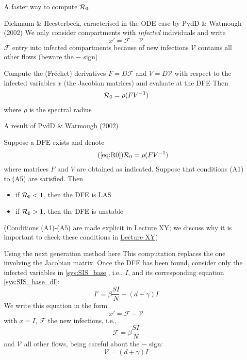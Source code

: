 \documentclass[aspectratio=43]{beamer}
\begin{document}
\begin{frame}{A faster way to compute $\mathcal{R}_0$}

Diekmann \& Heesterbeek, caracterised in the ODE case by PvdD \& Watmough (2002)
\vfill
We only consider compartments with \emph{infected} individuals and write
$$
x'=\mathcal{F}-\mathcal{V}
$$
\vfill
\bbullet $\mathcal{F}$ entry into infected compartments because of new infections
\vfill
\bbullet $\mathcal{V}$ contains all other flows (beware the $-$ sign)
\end{frame}

\begin{frame}
Compute the (Fréchet) derivatives $F=D\mathcal{F}$ and $V=D\mathcal{V}$ with respect to the infected variables $x$ (the Jacobian matrices) and evaluate at the DFE
\vfill
Then
\begin{equation}\label{eq:R0}
  \mathcal{R}_0=\rho(FV^{-1})
\end{equation}
where $\rho$ is the spectral radius
\end{frame}

\begin{frame}{A result of PvdD \& Watmough (2002)}

\begin{theorem}\label{th:PvdDWatmough2002}
Suppose a DFE exists and denote  
\begin{equation}\tag{\ref{eq:R0}}
  \R_0=\rho(FV^{-1})
\end{equation}
where matrices $F$ and $V$ are obtained as indicated. Suppose that conditions (A1) to (A5) are satisfied. Then
\begin{itemize}
  \item if $\mathcal{R}_0<1$, then the DFE is LAS
  \item if $\mathcal{R}_0>1$, then the DFE is unstable
\end{itemize}
\end{theorem}
\vfill
(Conditions (A1)-(A5) are made explicit in \href{https://julien-arino.github.io/petit-cours-epidemio-mathematique/cours-07-etapes-R0-final-size.html}{Lecture XY}; we discuss why it is important to check these conditions in \href{https://julien-arino.github.io/petit-cours-epidemio-mathematique/cours-11-plus-de-modelisation.html}{Lecture XY})
\end{frame}

\begin{frame}{Using the next generation method here}
This computation replaces the one involving the Jacobian matrix. Once the DFE has been found, consider only the infected variables in \eqref{sys:SIS_base}, i.e., $I$, and its corresponding equation \eqref{sys:SIS_base_dI}: 
\[
I' = \beta \frac{SI}N-(d+\gamma)I
\]
\vfill
We write this equation in the form
$$
x'=\mathcal{F}-\mathcal{V}
$$
with $x=I$, $\mathcal{F}$ the new infections, i.e.,
$$
\mathcal{F}=\beta \frac{SI}N
$$
and $\mathcal{V}$ all other flows, being careful about the $-$ sign:
\[
\mathcal{V}=(d+\gamma)I
\]
\end{frame}
\end{document}
